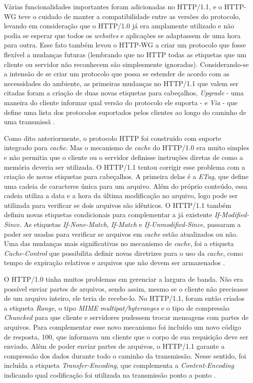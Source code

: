 Várias funcionalidades importantes foram adicionadas no HTTP/1.1, e o HTTP-WG teve o cuidado de manter a compatibilidade entre as versões do protocolo, levando em consideração que o HTTP/1.0 já era amplamente utilizado e não podia se esperar que todos os \textit{websites} e aplicações se adaptassem de uma hora para outra. Esse fato também levou o HTTP-WG a criar um protocolo que fosse flexível a mudanças futuras (lembrando que no HTTP todas as etiquetas que um cliente ou servidor não reconhecem são simplesmente ignoradas). Considerando-se a intensão de se criar um protocolo que possa se estender de acordo com as necessidades do ambiente, as primeiras mudanças no HTTP/1.1 que valem ser citadas foram a criação de duas novas etiquetas para cabeçalhos, \textit{Upgrade} - uma maneira do cliente informar qual versão do protocolo ele suporta - e \textit{Via} - que define uma lista dos protocolos suportados pelos clientes ao longo do caminho de uma transmissã \cite{Tanenbaum}.

Como dito anteriormente, o protocolo HTTP foi construído com suporte integrado para \textit{cache}. Mas o mecanismo de \textit{cache} do HTTP/1.0 era muito simples e não permitia que o cliente ou o servidor definisse instruções diretas de como a memória deveria ser utilizada. O HTTP/1.1 tentou corrigir esse problema com a criação de novas etiquetas para cabeçalhos. A primeira delas é a \textit{ETag}, que define uma cadeia de caracteres única para um arquivo. Além do próprio conteúdo, essa cadeia utiliza a data e a hora da última modificação no arquivo, logo pode ser utilizada para verificar se dois arquivos são idênticos. O HTTP/1.1 também definiu novas etiquetas condicionais para complementar a já existente \textit{If-Modified-Since}. As etiquetas \textit{If-None-Match}, \textit{If-Match} e \textit{If-Unmodified-Since}, passaram a poder ser usadas para verificar se arquivos em \textit{cache} estão atualizados ou não. Uma das mudanças mais significativas no mecanismo de \textit{cache}, foi a etiqueta \textit{Cache-Control} que possibilita definir novas diretrizes para o uso da \textit{cache}, como tempo de expiração relativos e arquivos que não devem ser armazenados \cite{Tanenbaum}.

O HTTP/1.0 tinha muitos problemas em gerenciar a largura de banda. Não era possível enviar partes de arquivos, sendo assim, mesmo se o cliente não precisasse de um arquivo inteiro, ele teria de recebe-lo. No HTTP/1.1, foram então criados a etiqueta \textit{Range}, o tipo \textit{MIME} \textit{multipat/byteranges} e o tipo de compressão \textit{Chuncked} para que cliente e servidores pudessem trocar mensagens com partes de arquivos. Para complementar esse novo mecanismo foi incluído um novo código de resposta, 100, que informava um cliente que o corpo de sua requisição deve ser enviado. Além de poder enviar partes de arquivos, o HTTP/1.1 garante a compressão dos dados durante todo o caminho da transmissão. Nesse sentido, foi incluída a etiqueta \textit{Transfer-Encoding}, que complementa a \textit{Content-Encoding} indicando qual codificação foi utilizada na transmissão ponto a ponto \cite{Tanenbaum}.

